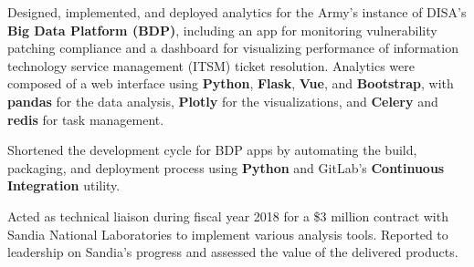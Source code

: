 


\begin{rExperience}

  \item Designed, implemented, and deployed analytics for the Army's instance of DISA's \textbf{Big Data Platform
    (BDP)}, including an app for monitoring vulnerability patching compliance and a dashboard for visualizing
    performance of information technology service management (ITSM) ticket resolution. Analytics were composed of a web
    interface using \textbf{Python}, \textbf{Flask}, \textbf{Vue}, and \textbf{Bootstrap}, with \textbf{pandas} for the
    data analysis, \textbf{Plotly} for the visualizations, and \textbf{Celery} and \textbf{redis} for task management.

  \item Shortened the development cycle for BDP apps by automating the build, packaging, and deployment process using
    \textbf{Python} and GitLab's \textbf{Continuous Integration} utility.


  \item Acted as technical liaison during fiscal year 2018 for a \$3 million contract with Sandia National Laboratories
    to implement various analysis tools. Reported to leadership on Sandia's progress and assessed the value of the delivered products.


\end{rExperience}
